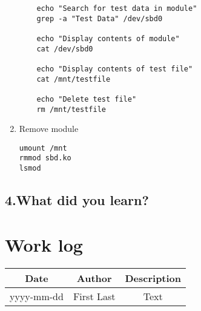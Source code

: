 \documentclass[onecolumn, draftclsnofoot,10pt, compsoc]{IEEEtran}
\begin{document}
\begin{enumerate}
\begin{lstlisting}
	echo "Search for test data in module"
	grep -a "Test Data" /dev/sbd0

	echo "Display contents of module"
	cat /dev/sbd0

	echo "Display contents of test file"
	cat /mnt/testfile

	echo "Delete test file"
	rm /mnt/testfile
\end{lstlisting}

\item Remove module
\begin{lstlisting}
umount /mnt
rmmod sbd.ko
lsmod
\end{lstlisting}

	\end{enumerate}

	\subsection*{4.What did you learn?}


	\section*{Work log}
  	\begin{center}
    	\begin{tabular}{ |c|c|c| }
    		\hline
    		Date & Author & Description \\
    		\hline
    		yyyy-mm-dd & First Last & Text \\
    		\hline
    	\end{tabular}
  	\end{center}


  
  
\end{document}

